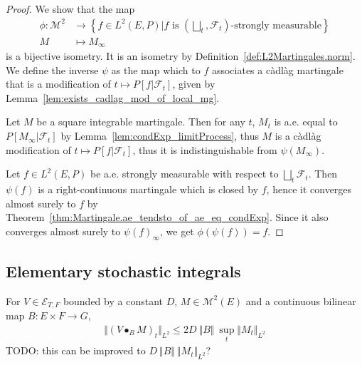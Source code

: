 \begin{proof}
  \leanok
  We show that the map
  \begin{align*}
    \phi : \mathcal{M}^2 & \to \left\{f \in L^2(E, P) | f \text{ is } \left(\bigsqcup_t, \mathcal{F}_t\right)\text{-strongly measurable}\right\} \\
    M & \mapsto M_\infty
  \end{align*}
  is a bijective isometry. It is an isometry by Definition~\ref{def:L2Martingales.norm}. We define the inverse $\psi$ as the map which to $f$ associates a càdlàg martingale that is a modification of $t \mapsto P[f | \mathcal{F}_t]$, given by Lemma~\ref{lem:exists_cadlag_mod_of_local_mg}.

  Let $M$ be a square integrable martingale. Then for any $t$, $M_t$ is a.e. equal to $P[M_\infty | \mathcal{F}_t]$ by Lemma~\ref{lem:condExp_limitProcess}, thus $M$ is a càdlàg modification of $t \mapsto P[f | \mathcal{F}_t]$, thus it is indistinguishable from $\psi(M_\infty)$.

  Let $f \in L^2(E, P)$ be a.e. strongly measurable with respect to $\bigsqcup_t \mathcal{F}_t$. Then $\psi(f)$ is a right-continuous martingale which is closed by $f$, hence it converges almost surely to $f$ by Theorem~\ref{thm:Martingale.ae_tendsto_of_ae_eq_condExp}. Since it also converges almost surely to $\psi(f)_\infty$, we get $\phi(\psi(f)) = f$.
\end{proof}





\subsection{Elementary stochastic integrals}

\begin{lemma}\label{lem:eLpNorm_elemStochIntegralBilin_le}
For $V \in \mathcal{E}_{T, F}$ bounded by a constant $D$, $M \in \mathcal{M}^2(E)$ and a continuous bilinear map $B: E \times F \to G$,
\begin{align*}
  \Vert (V \bullet_B M)_t \Vert_{L^2}
  \le 2 D \: \Vert B \Vert \: \sup_t \Vert M_t \Vert_{L^2}
\end{align*}
TODO: this can be improved to $D \: \Vert B \Vert \: \Vert M_t \Vert_{L^2}$?
\end{lemma}

